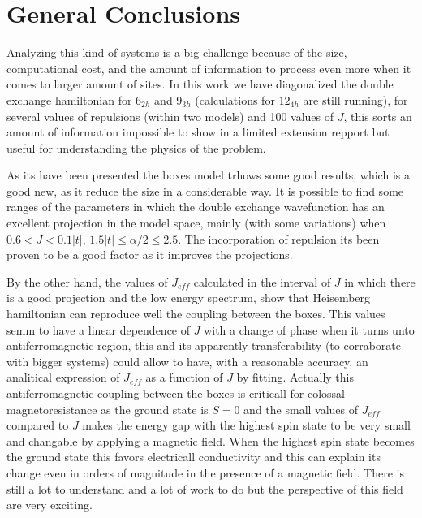 \documentclass[12pt,twoside]{report}
\begin{document}
	\chapter*{ General Conclusions}
	Analyzing this kind of systems is a big challenge because of the size, computational cost, and the amount of information to process even more when it comes to larger amount of sites. In this work we have diagonalized the double exchange hamiltonian for $6_{2h}$ and $9_{3h}$ (calculations for $12_{4h}$ are still running), for several values of repulsions (within two models) and 100 values of $J$, this sorts an amount of information impossible to show in a limited extension repport but useful for understanding the physics of the problem. 
	
	As its have been presented the boxes model trhows some good results, which is a good new, as it reduce the size in a considerable way. It is possible to find some ranges of the parameters in which the double exchange wavefunction has an excellent projection in the model space, mainly (with some variations) when $0.6 < J < 0.1|t|$, $1.5|t| \leq \alpha \slash 2 \leq 2.5$. The incorporation of repulsion its been proven to be a good factor as it improves the projections.
	
	By the other hand, the values of $J_{eff}$ calculated in the interval of $J$ in which there is a good projection and the low energy spectrum, show that Heisemberg hamiltonian can reproduce well the coupling between the boxes. This values semm to have a linear dependence of $J$ with a change of phase when it turns unto antiferromagnetic region, this and its apparently transferability (to corraborate with bigger systems) could allow to have, with a reasonable accuracy, an analitical expression of $J_{eff}$ as a function of $J$ by fitting. Actually this antiferromagnetic coupling between the boxes is criticall for colossal magnetoresistance as the ground state is $S=0$ and the small values of $J_{eff}$ compared to $J$ makes the energy gap with the highest spin state to be very small and changable by applying a magnetic field. When the highest spin state becomes the ground state this favors electricall conductivity and this can explain its change even in orders of magnitude in the presence of a magnetic field. There is still a lot to understand and a lot of work to do but the perspective of this field are very exciting.
	\newpage
	\renewcommand{\bibname}{References}
		\setcounter{page}{2}
\end{document}
